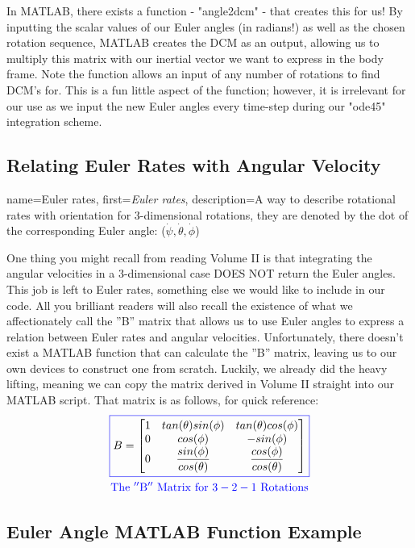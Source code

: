 \documentclass[12pt]{report}
\begin{document}
In MATLAB, there exists a function - "angle2dcm" - that creates this for us! By inputting the scalar values of our Euler angles (in radians!) as well as the chosen rotation sequence, MATLAB creates the DCM as an output, allowing us to multiply this matrix with our inertial vector we want to express in the body frame. Note the function allows an input of any number of rotations to find DCM's for. This is a fun little aspect of the function; however, it is irrelevant for our use as we input the new Euler angles every time-step during our "ode45" integration scheme.

\subsection{Relating Euler Rates with Angular Velocity}

{
    name=Euler rates,
    first={\textit{Euler rates}},
    description={A way to describe rotational rates with orientation for 3-dimensional rotations, they are denoted by the dot of the corresponding Euler angle: ($\dot{\psi},\dot{\theta},\dot{\phi}$)}
}

One thing you might recall from reading Volume II is that integrating the angular velocities in a 3-dimensional case DOES NOT return the Euler angles. This job is left to Euler rates, something else we would like to include in our code. All you brilliant readers will also recall the existence of what we affectionately call the ''B'' matrix that allows us to use Euler angles to express a relation between Euler rates and angular velocities. Unfortunately, there doesn't exist a MATLAB function that can calculate the ''B'' matrix, leaving us to our own devices to construct one from scratch. Luckily, we already did the heavy lifting, meaning we can copy the matrix derived in Volume II straight into our MATLAB script. That matrix is as follows, for quick reference:
\begin{gather}
    \color{blue}\boxed{\color{black}B=\begin{bmatrix}
    1&tan(\theta)sin(\phi)&tan(\theta)cos(\phi)\\
    0&cos(\phi)&-sin(\phi)\\
    0&\dfrac{sin(\phi)}{cos(\theta)}&\dfrac{cos(\phi)}{cos(\theta)}
\end{bmatrix}}\\\color{blue}\mathrm{The\ ''B''\ Matrix\ for\ 3-2-1\ Rotations}
\end{gather}

\subsection{Euler Angle MATLAB Function Example}
\end{document}
